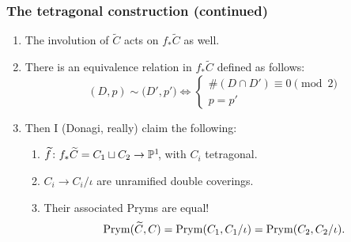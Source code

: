 \begin{frame}
\frametitle{The tetragonal construction (continued)}

\begin{enumerate}[<+->]
	\item The involution of $\widetilde C$ acts on $f_\ast \widetilde C$ as well.

	\item There is an equivalence relation in $f_\ast \widetilde C$ defined as follows:
	\[
	(D,p) \sim \big(D',p'\big) \iff
	\begin{cases}
	\#(D \cap D') \equiv 0 \pmod 2 \\
	p = p'
	\end{cases}
	\]

	\item Then I (Donagi, really) claim the following:
	\begin{enumerate}
		\item $\widetilde f\colon f_\ast \widetilde C = C_1 \sqcup C_2 \to \P^1\mkern-4mu$, with $C_i$ tetragonal.
		\item $C_i \to C_i/\iota$ are unramified double coverings.
		\item Their associated Pryms are equal!
		\[
		\Prym(\widetilde C, C)=\Prym(C_1,C_1/\iota)=\Prym(C_2,C_2/\iota).
		\]
	\end{enumerate}
\end{enumerate}



\end{frame}
